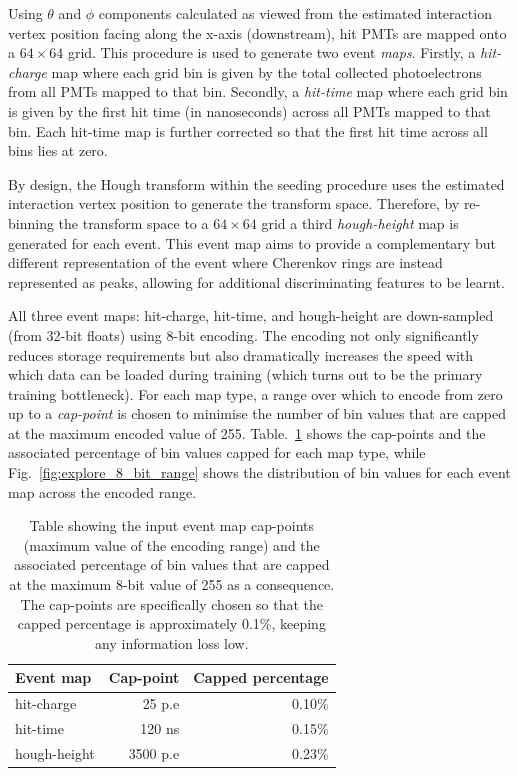 Using $\theta$ and $\phi$ components calculated as viewed from the estimated interaction vertex
position facing along the x-axis (downstream), hit PMTs are mapped onto a $64 \times 64$ grid.
This procedure is used to generate two event \emph{maps}. Firstly, a \emph{hit-charge} map where
each grid bin is given by the total collected photoelectrons from all PMTs mapped to that bin.
Secondly, a \emph{hit-time} map where each grid bin is given by the first hit time (in
nanoseconds) across all PMTs mapped to that bin. Each hit-time map is further corrected so that
the first hit time across all bins lies at zero.

By design, the Hough transform within the seeding procedure uses the estimated interaction vertex
position to generate the transform space. Therefore, by re-binning the transform space to a $64
\times 64$ grid a third \emph{hough-height} map is generated for each event. This event map aims
to provide a complementary but different representation of the event where Cherenkov rings are
instead represented as peaks, allowing for additional discriminating features to be learnt.

All three event maps: hit-charge, hit-time, and hough-height are down-sampled (from 32-bit floats)
using 8-bit encoding. The encoding not only significantly reduces storage requirements but also
dramatically increases the speed with which data can be loaded during training (which turns out to
be the primary training bottleneck). For each map type, a range over which to encode from zero up
to a \emph{cap-point} is chosen to minimise the number of bin values that are capped at the
maximum encoded value of 255. Table.~\ref{tab:encoding} shows the cap-points and the associated
percentage of bin values capped for each map type, while Fig.~\ref{fig:explore_8_bit_range} shows
the distribution of bin values for each event map across the encoded range.

\begin{table}
    \begin{tabular}{lrr}
        Event map    & Cap-point & Capped percentage \\
        \midrule
        hit-charge   & 25 p.e    & 0.10\%            \\
        hit-time     & 120 ns    & 0.15\%            \\
        hough-height & 3500 p.e  & 0.23\%            \\
    \end{tabular}
    \caption[Table of input event map 8-bit cap-points]
    {Table showing the input event map cap-points (maximum value of the encoding range) and the
        associated percentage of bin values that are capped at the maximum 8-bit value of 255 as a
        consequence. The cap-points are specifically chosen so that the capped percentage is
        approximately 0.1\%, keeping any information loss low.}
    \label{tab:encoding}
\end{table}

